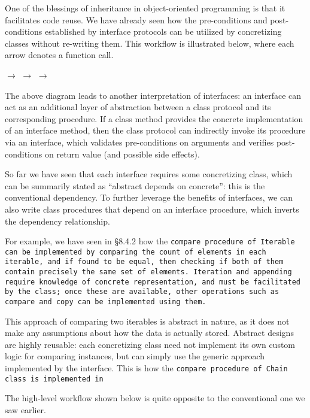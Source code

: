 One of the blessings of inheritance in object-oriented
programming is that it facilitates code reuse.
We have already seen how the pre-conditions and
post-conditions established by interface protocols can be
utilized by concretizing classes without re-writing them.
This workflow is illustrated below, where each arrow denotes a function call.

\begin{center}
$\longrightarrow$%
$\longrightarrow$%
$\longrightarrow$%
\end{center}

The above diagram leads to another interpretation of interfaces:
an interface can act as an additional layer of abstraction
between a class protocol and its corresponding procedure.
If a class method provides the concrete implementation of an interface method,
then the class protocol can indirectly invoke its procedure via an interface,
which validates pre-conditions on arguments and verifies
post-conditions on return value (and possible side effects).

So far we have seen that each interface requires some concretizing class,
which can be summarily stated as ``abstract depends on concrete'':
this is the conventional dependency.
To further leverage the benefits of interfaces, we can also write class procedures
that depend on an interface procedure, which inverts the dependency relationship.

For example, we have seen in \S 8.4.2 how the \tt{compare}
procedure of \tt{Iterable} can be implemented by comparing the
count of elements in each iterable, and if found to be equal,
then checking if both of them contain precisely the same set of elements.
Iteration and appending require knowledge of concrete representation,
and must be facilitated by the class; once these are available, other
operations such as \tt{compare} and \tt{copy} can be implemented using them.

This approach of comparing two iterables is abstract in nature,
as it does not make any assumptions about how the data is actually stored.
Abstract designs are highly reusable: each concretizing class
need not implement its own custom logic for comparing instances,
but can simply use the generic approach implemented by the interface.
This is how the \tt{compare} procedure of \tt{Chain} class
is implemented in 

The high-level workflow shown below is quite
opposite to the conventional one we saw earlier.

